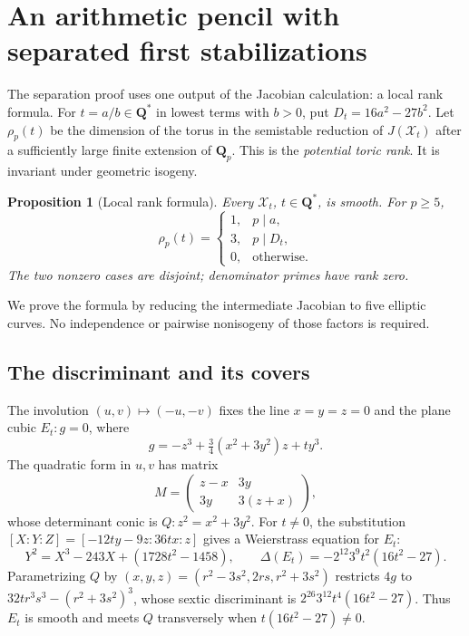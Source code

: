 \documentclass[11pt]{article}
\newtheorem{proposition}[theorem]{Proposition}
\theoremstyle{remark}
\begin{document}
\section{An arithmetic pencil with separated first stabilizations}
\label{sec:arithmetic}

The separation proof uses one output of the Jacobian calculation: a local
rank formula. For \(t=a/b\in\mathbf Q^*\) in lowest terms with \(b>0\),
put \(D_t=16a^2-27b^2\). Let \(\rho_p(t)\) be the dimension of the torus
in the semistable reduction of \(J(\mathcal X_t)\) after a sufficiently
large finite extension of \(\mathbf Q_p\). This is the
\emph{potential toric rank}. It is invariant under geometric isogeny.

\begin{proposition}[Local rank formula]
\label{prop:pencil-local-rank}
%
%
%
Every \(\mathcal X_t\), \(t\in\mathbf Q^*\), is smooth. For \(p\geq5\),
\begin{equation}
 \rho_p(t)=
 \begin{cases}
 1,&p\mid a,\\
 3,&p\mid D_t,\\
 0,&\text{otherwise}.
 \end{cases}
 \label{eq:pencil-rank}
\end{equation}
The two nonzero cases are disjoint; denominator primes have rank zero.
\end{proposition}

We prove the formula by reducing the intermediate Jacobian to five elliptic
curves. No independence or pairwise nonisogeny of those factors is required.

\subsection{The discriminant and its covers}

The involution \((u,v)\mapsto(-u,-v)\) fixes the line \(x=y=z=0\)
and the plane cubic \(E_t:g=0\), where
\[
 g=-z^3+\tfrac34(x^2+3y^2)z+ty^3.
\]
The quadratic form in \(u,v\) has matrix
\[
 M=\begin{pmatrix}z-x&3y\\3y&3(z+x)\end{pmatrix},
\]
whose determinant conic is \(Q:z^2=x^2+3y^2\).
For \(t\ne0\), the substitution
\([X:Y:Z]=[-12ty-9z:36tx:z]\) gives a Weierstrass equation for \(E_t\):
\begin{equation}
 Y^2=X^3-243X+(1728t^2-1458),\qquad
 \Delta(E_t)=-2^{12}3^9t^2(16t^2-27).
 \label{eq:pencil-elliptic}
\end{equation}
Parametrizing \(Q\) by
\((x,y,z)=(r^2-3s^2,2rs,r^2+3s^2)\) restricts \(4g\) to
\(32tr^3s^3-(r^2+3s^2)^3\), whose sextic discriminant is
\(2^{26}3^{12}t^4(16t^2-27)\).
Thus \(E_t\) is smooth and meets \(Q\) transversely when
\(t(16t^2-27)\ne0\).
\end{document}
